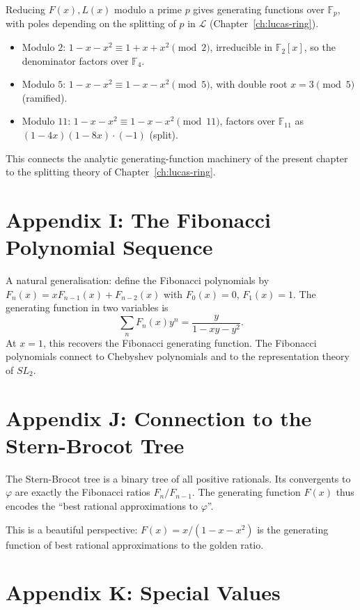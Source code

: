 Reducing $F(x), L(x)$ modulo a prime $p$ gives generating functions
over $\mathbb{F}_p$, with poles depending on the splitting of $p$ in
$\mathcal{L}$ (Chapter~\ref{ch:lucas-ring}).

\begin{itemize}
  \item Modulo $2$: $1 - x - x^2 \equiv 1 + x + x^2 \pmod 2$, irreducible
        in $\mathbb{F}_2[x]$, so the denominator factors over
        $\mathbb{F}_4$.
  \item Modulo $5$: $1 - x - x^2 \equiv 1 - x - x^2 \pmod 5$, with
        double root $x = 3 \pmod 5$ (ramified).
  \item Modulo $11$: $1 - x - x^2 \equiv 1 - x - x^2 \pmod{11}$,
        factors over $\mathbb{F}_{11}$ as $(1 - 4x)(1 - 8x) \cdot (-1)$
        (split).
\end{itemize}

This connects the analytic generating-function machinery of the
present chapter to the splitting theory of Chapter~\ref{ch:lucas-ring}.

\section*{Appendix I: The Fibonacci Polynomial Sequence}
\label{sec:05-app-I}

A natural generalisation: define the Fibonacci polynomials by
$F_n(x) = x F_{n-1}(x) + F_{n-2}(x)$ with $F_0(x) = 0$, $F_1(x) = 1$.
The generating function in two variables is
\[
  \sum_n F_n(x) y^n = \frac{y}{1 - xy - y^2}.
\]
At $x = 1$, this recovers the Fibonacci generating function. The
Fibonacci polynomials connect to Chebyshev polynomials and to the
representation theory of $SL_2$.

\section*{Appendix J: Connection to the Stern-Brocot Tree}
\label{sec:05-app-J}

The Stern-Brocot tree is a binary tree of all positive rationals.
Its convergents to $\varphi$ are exactly the Fibonacci ratios
$F_n/F_{n-1}$. The generating function $F(x)$ thus encodes the
``best rational approximations to $\varphi$''.

This is a beautiful perspective: $F(x) = x/(1 - x - x^2)$ is the
generating function of best rational approximations to the golden ratio.

\section*{Appendix K: Special Values}
\label{sec:05-app-K}


